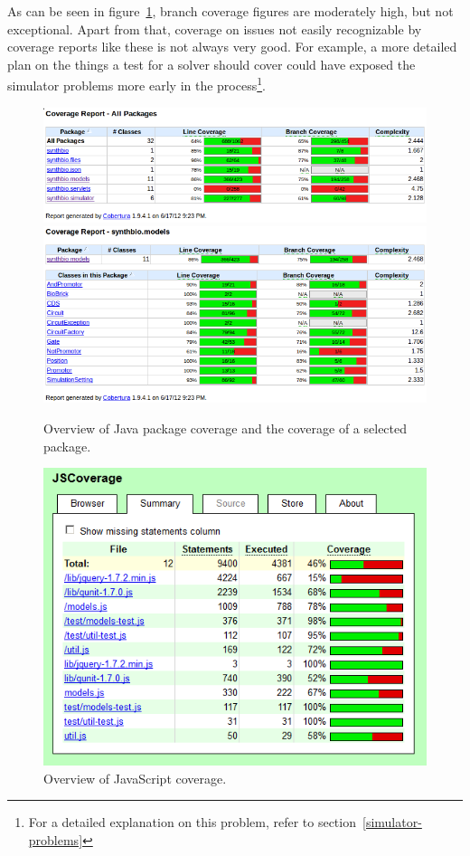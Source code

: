 \documentclass[a4paper]{article}
\begin{document}
As can be seen in figure~\ref{fig-java-coverage}, branch coverage figures are moderately high, but not exceptional. Apart from that, coverage on issues not easily recognizable by coverage reports like these is not always very good. For example, a more detailed plan on the things a test for a solver should cover could have exposed the simulator problems more early in the process\footnote{For a detailed explanation on this problem, refer to section~\ref{simulator-problems}}.
\begin{figure}[h!]
	\includegraphics[width=\textwidth]{pictures/java-coverage-packages.png}
	\includegraphics[width=\textwidth]{pictures/java-coverage-models.png}
	\caption{Overview of Java package coverage and the coverage of a selected package.}
	\label{fig-java-coverage}
\end{figure}
\begin{figure}[h!]
	\centering\includegraphics[width=.6\textwidth]{../../screenshots/2012-06-17-jscoverage-report-small.png}
	\caption{Overview of JavaScript coverage.}
	\label{fig-javascript-coverage}
\end{figure}
\end{document}
